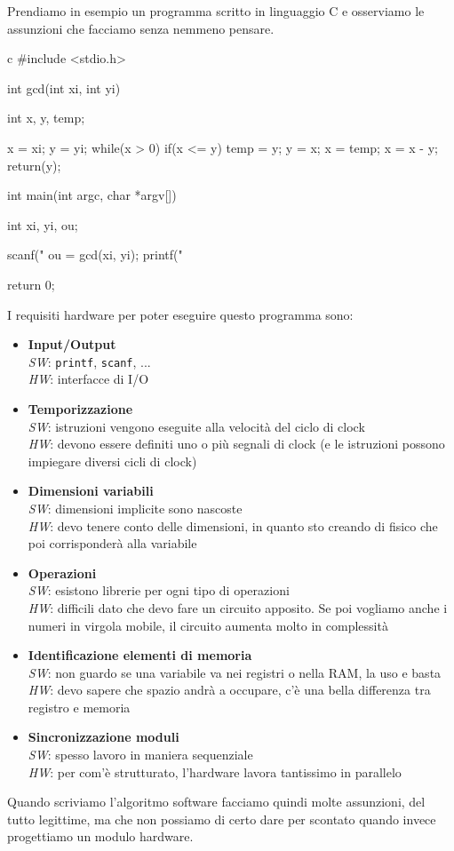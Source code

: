 \documentclass[10pt,a4paper,oneside]{scrbook}
\begin{document}
Prendiamo in esempio un programma scritto in linguaggio C e osserviamo le assunzioni che facciamo senza nemmeno pensare.\\
\begin{sourcecode}{c}
#include <stdio.h>

int gcd(int xi, int yi){
   	int x, y, temp;
   	
   	x = xi;
   	y = yi;
   	while(x > 0){
   		if(x <= y){
   			temp = y;
   			y = x;
   			x = temp;
   		}
   		x = x - y;
   	}
   	return(y);
}

int main(int argc, char *argv[]){
   	int xi, yi, ou;
    
    scanf("%
    ou = gcd(xi, yi);
    printf("%
    
    return 0;
}
\end{sourcecode}
I requisiti hardware per poter eseguire questo programma sono:
\begin{itemize}
    \item \textbf{Input/Output}\\
    \textit{SW}: \texttt{printf}, \texttt{scanf}, ...\\
    \textit{HW}: interfacce di I/O
    \item \textbf{Temporizzazione}\\
    \textit{SW}: istruzioni vengono eseguite alla velocità del ciclo di clock\\
    \textit{HW}: devono essere definiti uno o più segnali di clock (e le istruzioni possono impiegare diversi cicli di clock)
    \item \textbf{Dimensioni variabili}\\
    \textit{SW}: dimensioni implicite sono nascoste\\
    \textit{HW}: devo tenere conto delle dimensioni, in quanto sto creando di fisico che poi corrisponderà alla variabile
    \item \textbf{Operazioni}\\
    \textit{SW}: esistono librerie per ogni tipo di operazioni\\
    \textit{HW}: difficili dato che devo fare un circuito apposito. Se poi vogliamo anche i numeri in virgola mobile, il circuito aumenta molto in complessità
    \item \textbf{Identificazione elementi di memoria}\\
    \textit{SW}: non guardo se una variabile va nei registri o nella RAM, la uso e basta\\
    \textit{HW}: devo sapere che spazio andrà a occupare, c'è una bella differenza tra registro e memoria
    \item \textbf{Sincronizzazione moduli}\\
    \textit{SW}: spesso lavoro in maniera sequenziale\\
    \textit{HW}: per com'è strutturato, l'hardware lavora tantissimo in parallelo        
\end{itemize}
Quando scriviamo l'algoritmo software facciamo quindi molte assunzioni, del tutto legittime, ma che non possiamo di certo dare per 
scontato quando invece progettiamo un modulo hardware.
\end{document}
